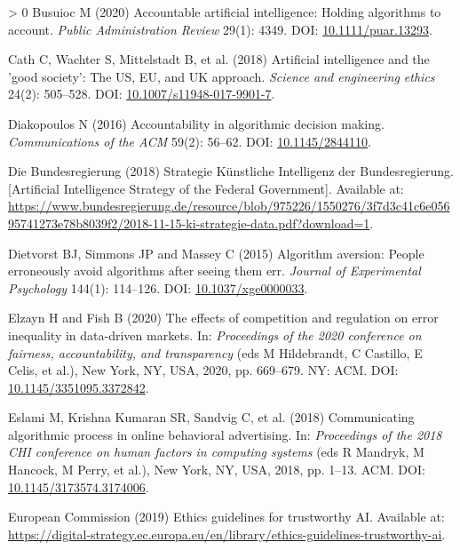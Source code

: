 \documentclass{article}
\newlength{\cslhangindent}
\newenvironment{CSLReferences}[3] %
 {%
  \setlength{\parindent}{0pt}
  \ifodd #1 \everypar{\setlength{\hangindent}{\cslhangindent}}\ignorespaces\fi
  \ifnum #2 > 0
  \setlength{\parskip}{#2\baselineskip}
  \fi
 }%
 {}
\begin{document}
\begin{CSLReferences}{1}{0}
\leavevmode\hypertarget{ref-Busuioc.2020}{}%
Busuioc M (2020) Accountable artificial intelligence: Holding algorithms
to account. \emph{Public Administration Review} 29(1): 4349. DOI:
\href{https://doi.org/10.1111/puar.13293}{10.1111/puar.13293}.

\leavevmode\hypertarget{ref-Cath.2018}{}%
Cath C, Wachter S, Mittelstadt B, et al. (2018) Artificial intelligence
and the 'good society': The US, EU, and UK approach. \emph{Science and
engineering ethics} 24(2): 505--528. DOI:
\href{https://doi.org/10.1007/s11948-017-9901-7}{10.1007/s11948-017-9901-7}.

\leavevmode\hypertarget{ref-Diakopoulos.2016}{}%
Diakopoulos N (2016) Accountability in algorithmic decision making.
\emph{Communications of the ACM} 59(2): 56--62. DOI:
\href{https://doi.org/10.1145/2844110}{10.1145/2844110}.

\leavevmode\hypertarget{ref-DieBundesregierung.2018}{}%
Die Bundesregierung (2018) Strategie K{ü}nstliche Intelligenz der
Bundesregierung. [Artificial Intelligence Strategy of the Federal Government]. Available at:
\url{https://www.bundesregierung.de/resource/blob/975226/1550276/3f7d3c41c6e05695741273e78b8039f2/2018-11-15-ki-strategie-data.pdf?download=1}.

\leavevmode\hypertarget{ref-Dietvorst.2015}{}%
Dietvorst BJ, Simmons JP and Massey C (2015) Algorithm aversion: People
erroneously avoid algorithms after seeing them err. \emph{Journal of
Experimental Psychology} 144(1): 114--126. DOI:
\href{https://doi.org/10.1037/xge0000033}{10.1037/xge0000033}.

\leavevmode\hypertarget{ref-Elzayn.2020}{}%
Elzayn H and Fish B (2020) The effects of competition and regulation on
error inequality in data-driven markets. In: \emph{Proceedings of the
2020 conference on fairness, accountability, and transparency} (eds M
Hildebrandt, C Castillo, E Celis, et al.), New York, NY, USA, 2020, pp.
669--679. {NY: ACM}. DOI:
\href{https://doi.org/10.1145/3351095.3372842}{10.1145/3351095.3372842}.

\leavevmode\hypertarget{ref-Eslami.2018}{}%
Eslami M, Krishna Kumaran SR, Sandvig C, et al. (2018) Communicating
algorithmic process in online behavioral advertising. In:
\emph{Proceedings of the 2018 CHI conference on human factors in
computing systems} (eds R Mandryk, M Hancock, M Perry, et al.), New
York, NY, USA, 2018, pp. 1--13. ACM. DOI:
\href{https://doi.org/10.1145/3173574.3174006}{10.1145/3173574.3174006}.

\leavevmode\hypertarget{ref-EuropeanCommission.2019}{}%
European Commission (2019) Ethics guidelines for trustworthy AI.
Available at:
\url{https://digital-strategy.ec.europa.eu/en/library/ethics-guidelines-trustworthy-ai}.


\end{CSLReferences}
\end{document}
